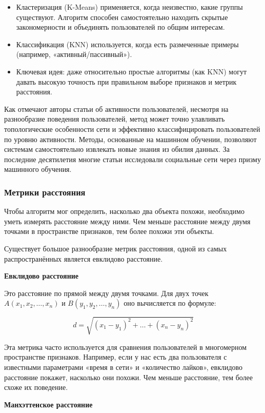\documentclass[14pt, a4paper]{extarticle}
\begin{document}
\begin{itemize}
    \item Кластеризация (K-Means) применяется, когда неизвестно, какие группы существуют. Алгоритм способен самостоятельно находить скрытые закономерности и объединять пользователей по общим интересам.
    \item Классификация (KNN) используется, когда есть размеченные примеры (например, «активный/пассивный»).
    \item Ключевая идея: даже относительно простые алгоритмы (как KNN) могут давать высокую точность при правильном выборе признаков и метрик расстояния.
\end{itemize}

Как отмечают авторы статьи об активности пользователей, несмотря на разнообразие поведения пользователей, метод может точно улавливать топологические особенности сети и эффективно классифицировать пользователей по уровню активности. Методы, основанные на машинном обучении, позволяют системам самостоятельно извлекать новые знания из обилия данных. За последние десятилетия многие статьи исследовали социальные сети через призму машинного обучения.

\subsubsection{Метрики расстояния}

Чтобы алгоритм мог определить, насколько два объекта похожи, необходимо уметь измерять расстояние между
ними. Чем меньше расстояние между двумя точками в пространстве признаков, тем более похожи эти объекты.

Существует большое разнообразие метрик расстояния, одной из самых распространённых является евклидово 
расстояние.

\textbf{Евклидово расстояние}
\smallskip

Это расстояние по прямой между двумя точками. Для двух точек 
\( A(x_1, x_2, \dots, x_n) \) и \( B(y_1, y_2, \dots, y_n) \) 
оно вычисляется по формуле:

\[
d = \sqrt{(x_1 - y_1)^2 + \dots + (x_n - y_n)^2}
\]

Эта метрика часто используется для сравнения пользователей в многомерном пространстве признаков.
Например, если у нас есть два пользователя с известными параметрами «время в сети» и «количество лайков»,
евклидово расстояние покажет, насколько они похожи. Чем меньше расстояние, тем более схоже их поведение.

\textbf{Манхэттенское расстояние}
\smallskip
\end{document}
